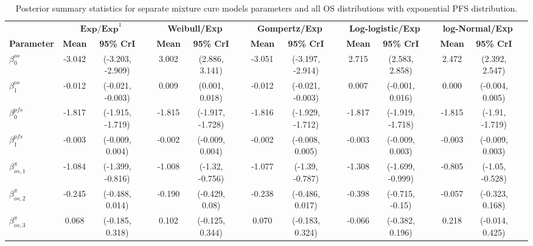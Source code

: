 \documentclass[AMA,STIX1COL]{WileyNJD-v2}
\begin{document}

\begin{landscape}
\begin{center}
\begin{table}[t]
\caption{Posterior summary statistics for separate mixture cure models parameters and all OS distributions with exponential PFS distribution. \label{tab:post_sep_pfs_exp}}
\centering
\begin{tabular}{l c c c c c c c c c c c c c c c}
\toprule
\multicolumn{1}{l}{} & \multicolumn{2}{c}{$\textbf{Exp/Exp}^1$} & & \multicolumn{2}{c}{\textbf{Weibull/Exp}} & & \multicolumn{2}{c}{\textbf{Gompertz/Exp}} & & \multicolumn{2}{c}{\textbf{Log-logistic/Exp}} & & \multicolumn{2}{c}{\textbf{log-Normal/Exp}}\\
\cmidrule{2-3}\cmidrule{5-6}\cmidrule{8-9}\cmidrule{11-12}\cmidrule{14-15}
\textbf{Parameter} & \textbf{Mean} & \textbf{95\% CrI} & & \textbf{Mean} & \textbf{95\% CrI} & & \textbf{Mean} & \textbf{95\% CrI} & & \textbf{Mean} & \textbf{95\% CrI} & & \textbf{Mean} & \textbf{95\% CrI}\\
\midrule
$\beta^{os}_0$ & -3.042 & (-3.203, -2.909) &  & 3.002 & (2.886, 3.141) &  & -3.051 & (-3.197, -2.914) &  & 2.715 & (2.583, 2.858) &  & 2.472 & (2.392, 2.547) & \\
$\beta^{os}_1$ & -0.012 & (-0.021, -0.003) &  & 0.009 & (0.001, 0.018) &  & -0.012 & (-0.021, -0.003) &  & 0.007 & (-0.001, 0.016) &  & 0.000 & (-0.004, 0.005) & \\
$\beta^{pfs}_0$ & -1.817 & (-1.915, -1.719) &  & -1.815 & (-1.917, -1.728) &  & -1.816 & (-1.929, -1.712) &  & -1.817 & (-1.919, -1.718) &  & -1.815 & (-1.91, -1.719) & \\
$\beta^{pfs}_1$ & -0.003 & (-0.009, 0.004) &  & -0.002 & (-0.009, 0.004) &  & -0.002 & (-0.008, 0.005) &  & -0.003 & (-0.009, 0.003) &  & -0.003 & (-0.009, 0.003) & \\
$\beta^{\pi}_{os, 1}$ & -1.084 & (-1.399, -0.816) &  & -1.008 & (-1.32, -0.756) &  & -1.077 & (-1.39, -0.787) &  & -1.308 & (-1.699, -0.999) &  & -0.805 & (-1.05, -0.528) & \\
$\beta^{\pi}_{os, 2}$ & -0.245 & (-0.488, 0.014) &  & -0.190 & (-0.429, 0.08) &  & -0.238 & (-0.486, 0.017) &  & -0.398 & (-0.715, -0.15) &  & -0.057 & (-0.323, 0.168) & \\
$\beta^{\pi}_{os, 3}$ & 0.068 & (-0.185, 0.318) &  & 0.102 & (-0.125, 0.344) &  & 0.070 & (-0.183, 0.324) &  & -0.066 & (-0.382, 0.196) &  & 0.218 & (-0.014, 0.425) & \\

\end{tabular}
\end{table}
\end{center}
\end{landscape}
\end{document}
